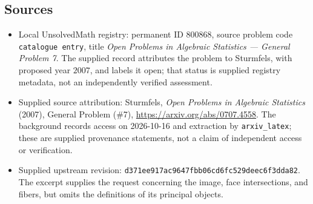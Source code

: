 \documentclass[11pt]{article}
\begin{document}
\subsection{Sources}
\begin{itemize}
\item Local UnsolvedMath registry: permanent ID \(800868\), source problem code \texttt{catalogue entry}, title \emph{Open Problems in Algebraic Statistics --- General Problem 7}. The supplied record attributes the problem to Sturmfels, with proposed year \(2007\), and labels it open; that status is supplied registry metadata, not an independently verified assessment.
\item Supplied source attribution: Sturmfels, \emph{Open Problems in Algebraic Statistics} (2007), General Problem (\#7), \url{https://arxiv.org/abs/0707.4558}. The background records access on 2026-10-16 and extraction by \texttt{arxiv\_latex}; these are supplied provenance statements, not a claim of independent access or verification.
\item Supplied upstream revision: \texttt{d371ee917ac9647fbb06cd6fc529deec6f3dda82}. The excerpt supplies the request concerning the image, face intersections, and fibers, but omits the definitions of its principal objects.
\end{itemize}
\end{document}
